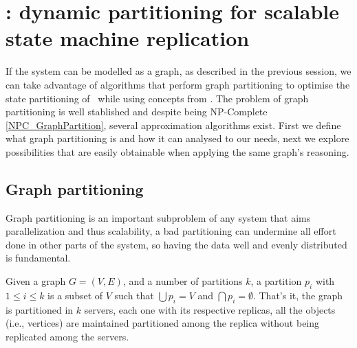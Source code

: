 \section{\dynastar: dynamic partitioning for scalable state machine replication}



If the system can be modelled as a graph, as described in the previous session, we can take advantage of algorithms that perform graph partitioning to optimise the state partitioning of \ssmr\  while using concepts from \dssmr. The problem of graph partitioning is well stablished and despite being NP-Complete \ref{NPC_GraphPartition}, several approximation algorithms exist. First we define what graph partitioning is and how it can analysed to our needs, next we explore possibilities that are easily obtainable when applying the same graph's reasoning.

\subsection{Graph partitioning}
Graph partitioning is an important subproblem of any system that aims parallelization and thus scalability, a bad partitioning can undermine all effort done in other parts of the system, so having the data well and evenly distributed is fundamental.



Given a graph $G = (V, E)$, and a number of partitions $k$, a partition $p_i$ with $1 \leq i \leq k$ is a subset of $V$ such that $\bigcup p_i = V$ and $\bigcap p_i = \emptyset$. That's it, the graph is partitioned in $k$ servers, each one with its respective replicas, all the objects (i.e., vertices) are maintained partitioned among the replica without being replicated among the servers.

